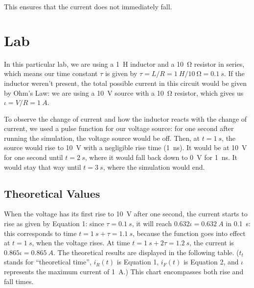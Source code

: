 \documentclass{article}
\begin{document}
This ensures that the current does not immediately fall.

\section{Lab} In this particular lab, we are using a
\SI{1}{H} inductor
and a \SI{10}{\ohm} resistor in series, which means our
time constant \(\tau\) is given by 
\(\tau = L/R = \SI{1}{H}/\SI{10}{\ohm} = \SI{0.1}{s}\).
If the inductor weren't present, the total possible current
in this circuit would be given by Ohm's Law: we are using
a \SI{10}{V} source with a \SI{10}{\ohm} resistor, which
gives us \(\iota = V/R = \SI{1}{A}\).

To observe the change of current and how the inductor reacts
with the change of current, we used a pulse function for
our voltage source: for one second after running the simulation,
the voltage source would be off. Then, at \(t = \SI{1}{s}\),
the source would rise to \SI{10}{V} with a negligible rise time
(\SI{1}{ns}). It would be at \SI{10}{V} for one second until
\(t = \SI{2}{s}\), where it would fall back down to \SI{0}{V}
for \SI{1}{ns}. It would stay that way until
\(t = \SI{3}{s}\), where the simulation would end.

\subsection{Theoretical Values} When the voltage has its first rise to \SI{10}{V} after one
second, the current starts to rise as given by Equation 1:
since \(\tau = \SI{0.1}{s}\), it will reach \(0.632\iota
= \SI{0.632}{A}\) in \SI{0.1}{s}: this corresponds to time
\(t = \SI{1}{s} + \tau = \SI{1.1}{s}\), because the function
goes into effect at \(t = \SI{1}{s}\), when the voltage rises.
At time \(t = \SI{1}{s} + 2\tau = \SI{1.2}{s}\), the current
is \(0.865\iota = \SI{0.865}{A}\). The theoretical results are
displayed in the following table. (\(t_t\) stands for ``theoretical
time'', \(i_R(t)\) is Equation 1, \(i_F(t)\) is Equation 2,
and \(\iota\) represents the maximum current of \SI{1}{A}.)
This chart encompasses both rise and fall times.
\end{document}
